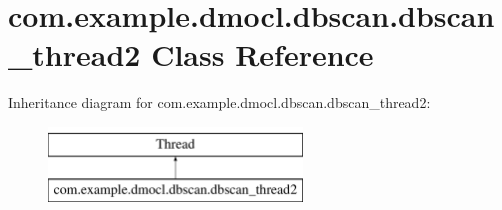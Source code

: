 \hypertarget{classcom_1_1example_1_1dmocl_1_1dbscan_1_1dbscan__thread2}{}\section{com.\+example.\+dmocl.\+dbscan.\+dbscan\+\_\+thread2 Class Reference}
\label{classcom_1_1example_1_1dmocl_1_1dbscan_1_1dbscan__thread2}
Inheritance diagram for com.\+example.\+dmocl.\+dbscan.\+dbscan\+\_\+thread2\+:\begin{figure}[H]
\begin{center}
\leavevmode
\includegraphics[height=2.000000cm]{classcom_1_1example_1_1dmocl_1_1dbscan_1_1dbscan__thread2}
\end{center}
\end{figure}
